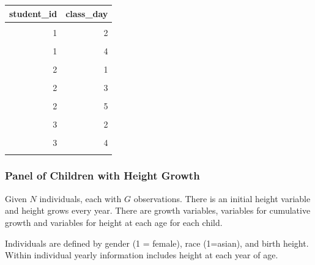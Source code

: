 \documentclass[
]{book}
\begin{document}
\begin{table}[!h]
\centering
\begin{tabular}{r|r}
\hline
student\_id & class\_day\\
\hline
\cellcolor{gray!6}{1} & \cellcolor{gray!6}{1}\\
\hline
1 & 2\\
\hline
\cellcolor{gray!6}{1} & \cellcolor{gray!6}{3}\\
\hline
1 & 4\\
\hline
\cellcolor{gray!6}{1} & \cellcolor{gray!6}{5}\\
\hline
2 & 1\\
\hline
\cellcolor{gray!6}{2} & \cellcolor{gray!6}{2}\\
\hline
2 & 3\\
\hline
\cellcolor{gray!6}{2} & \cellcolor{gray!6}{4}\\
\hline
2 & 5\\
\hline
\cellcolor{gray!6}{3} & \cellcolor{gray!6}{1}\\
\hline
3 & 2\\
\hline
\cellcolor{gray!6}{3} & \cellcolor{gray!6}{3}\\
\hline
3 & 4\\
\hline
\cellcolor{gray!6}{3} & \cellcolor{gray!6}{5}\\
\hline
\end{tabular}
\end{table}

\hypertarget{panel-of-children-with-height-growth}{%
\subsubsection{Panel of Children with Height Growth}\label{panel-of-children-with-height-growth}}

Given \(N\) individuals, each with \(G\) observations. There is an initial height variable and height grows every year. There are growth variables, variables for cumulative growth and variables for height at each age for each child.

Individuals are defined by gender (1 = female), race (1=asian), and birth height. Within individual yearly information includes height at each year of age.
\end{document}
